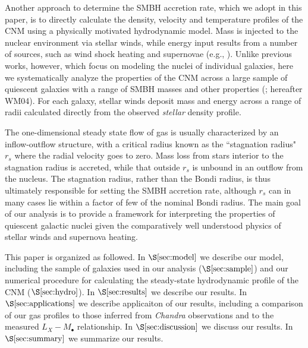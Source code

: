 \documentclass[usenatbib,fleqn]{mn2e}
\newcommand{\rs}{r_s}
\newcommand{\Mbh}[1][]{M_{\bullet#1}}
\begin{document}
Another approach to determine the SMBH accretion rate, which we adopt
in this paper, is to directly calculate the density, velocity and
temperature profiles of the CNM using a physically motivated
hydrodynamic model.  Mass is injected to the nuclear environment via
stellar winds, while energy input results from a number of sources,
such as wind shock heating and supernovae (e.g.,
\citealt{Quataert:2004a,De-ColleGuillochon+:2012a,ShcherbakovWong+:2014a}).
Unlike previous works, however, which focus on modeling the nuclei of
individual galaxies, here we systematically analyze the properties of
the CNM across a large sample of quiescent galaxies with a range of
SMBH masses and other properties (\citealt{WangMerritt:2004a};
hereafter WM04).  For each galaxy, stellar winds deposit mass and
energy across a range of radii calculated directly from the observed
{\it stellar} density profile.

The one-dimensional steady state flow of gas is usually characterized
by an inflow-outflow structure, with a critical radius known as the
``stagnation radius" $\rs$ where the radial velocity goes to zero.
Mass loss from stars interior to the stagnation radius is accreted,
while that outside $\rs$ is unbound in an outflow from the nucleus.
The stagnation radius, rather than the Bondi radius, is thus
ultimately responsible for setting the SMBH accretion rate, although
$\rs$ can in many cases lie within a factor of few of the
nominal Bondi radius.
The main goal of our analysis is to provide a framework for
interpreting the properties of quiescent galactic nuclei given the
comparatively well understood physics of stellar winds and supernova
heating.

This paper is organized as followed.  In $\S\ref{sec:model}$ we
describe our model, including the sample of galaxies used in our
analysis ($\S\ref{sec:sample}$) and our numerical procedure for
calculating the steady-state hydrodynamic profile of the CNM
($\S\ref{sec:hydro}$).  In $\S\ref{sec:results}$ we describe our
results.  In $\S\ref{sec:applications}$ we describe applicaiton of our
results, including a comparison of our gas profiles to those inferred
from {\it Chandra} observations and to the measured $L_X-\Mbh$
relationship.  In $\S\ref{sec:discussion}$ we discuss our results.  In
$\S\ref{sec:summary}$ we summarize our results.
\end{document}
